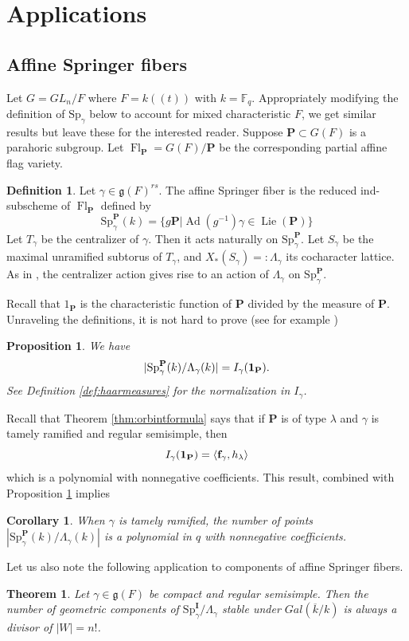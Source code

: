 \documentclass{amsart}
\numberwithin{equation}{section}
\newtheorem{theorem}[lemma]{Theorem}%
\newtheorem{corollary}[lemma]{Corollary}%
\newtheorem{proposition}[lemma]{Proposition}%
\theoremstyle{definition}
\newtheorem{definition}[lemma]{Definition}%
\def\16{{\bf 16}}
\def\1{{\bf 1}}
\def\Sp{{\mathrm{Sp}}}
\DeclareMathOperator{\Ad}{Ad}
\DeclareMathOperator{\Lie}{Lie}
\DeclareMathOperator{\Fl}{Fl}
\newcommand{\fgamma}{\mathbf{f}_{\gamma}}
\newcommand{\fg}{\mathfrak{g}}
\newcommand{\bP}{\mathbf{P}}
\newcommand{\bI}{\mathbf{I}}
\newcommand{\F}{{\mathbb F}}
\begin{document}
\section{Applications}
\label{sec:applications}
\subsection{Affine Springer fibers}
Let $G=GL_n/F$ where $F=k((t))$ with $k=\F_q$. Appropriately modifying the definition of $\Sp_\gamma$ below to account for mixed characteristic $F$, we get similar results but leave these for the interested reader. Suppose $\bP\subset G(F)$ is a parahoric subgroup. Let $\Fl_\bP=G(F)/\bP$ be the corresponding partial affine flag variety.

\begin{definition} Let $\gamma\in\fg(F)^{rs}$.
The affine Springer fiber is the reduced ind-subscheme of $\Fl_\bP$ defined by
$$\Sp_\gamma^\bP(k)=\{g\bP|\Ad(g^{-1})\gamma\in \Lie(\bP)\}$$ Let $T_\gamma$ be the centralizer of $\gamma$. Then it acts naturally on $\Sp^\bP_\gamma$. Let $S_\gamma$ be the maximal unramified subtorus of $T_\gamma$, and $X_*(S_\gamma)=:\Lambda_\gamma$ its cocharacter lattice. As in \cite[Section 15]{GKM}, the centralizer action gives rise to an action of $\Lambda_\gamma$ on $\Sp_\gamma^\bP$.
\end{definition}
Recall that $1_\bP$ is the characteristic function of $\bP$ divided by the measure of $\bP$. Unraveling the definitions, it is not hard to prove (see for example \cite[Theorem 15.8.]{GKM})
\begin{proposition}
\label{prop:numberofpoints} 
We have $$|\Sp_\gamma^\bP(k)/\Lambda_\gamma(k)|=I_\gamma(\1_\bP).$$ See Definition \ref{def:haarmeasures} for the normalization in $I_\gamma$.
\end{proposition}
Recall that Theorem \ref{thm:orbintformula} says that if $\bP$ is of type $\lambda$ and $\gamma$ is tamely ramified and regular semisimple, then
$$I_\gamma(\1_\bP)=\langle \fgamma,h_\lambda\rangle$$ which is a polynomial with nonnegative coefficients. This result, combined with Proposition \ref{prop:numberofpoints} implies
\begin{corollary}
\label{cor:asfcount}
When $\gamma$ is tamely ramified, the number of points $|\Sp_\gamma^\bP(k)/\Lambda_\gamma(k)|$ is a polynomial in $q$ with nonnegative coefficients.
\end{corollary}
Let us also note the following application to components of affine Springer fibers.
\begin{theorem}
\label{thm:components}
Let $\gamma\in \fg(F)$ be compact and regular semisimple. 
Then the number of geometric components of $\Sp_\gamma^{\bI}/\Lambda_\gamma$ stable under $Gal(\overline{k}/k)$ is always a divisor of  $|W|=n!$.%
\end{theorem}
\end{document}
